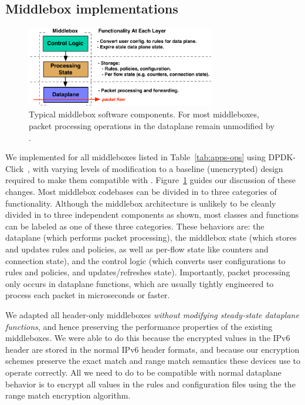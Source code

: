 \subsection{Middlebox implementations}
\label{sec:middleboxes}

\begin{figure}[t]
  \includegraphics[width=3.25in]{fig/mbarch}
  \caption[]{\label{fig:mbarch} Typical middlebox software components. For most middleboxes, packet processing operations in the dataplane remain unmodified by \sys.}
\end{figure}

We implemented \sys for all middleboxes listed in Table~\ref{tab:apps-ops} using DPDK-Click~\cite{dpdk-click}, with varying levels of modification to a baseline (unencrypted) design required to make them compatible with \sys. 
Figure~\ref{fig:mbarch} guides our discussion of these changes. Most middlebox codebases can be divided in to three categories of functionality.
Although the middlebox architecture is unlikely to be cleanly divided in to three independent components as shown, most classes and functions can be labeled as one of these three categories.
These behaviors are: the dataplane (which performs packet processing), the middlebox state (which stores and updates rules and policies, as well as per-flow state like counters and connection state), and the control logic (which converts user configurations to rules and policies, and updates/refreshes state). 
Importantly, packet processing only occurs in dataplane functions, which are usually tightly engineered to process each packet in microseconds or faster.

We adapted all header-only middleboxes {\it without modifying steady-state dataplane functions}, and hence preserving the performance properties of the existing middleboxes.
We were able to do this because the encrypted values in the IPv6 header are stored in the normal IPv6 header formats, and because our encryption schemes preserve the exact match and range match semantics these devices use to operate correctly.
All we need to do to be compatible with normal dataplane behavior is to encrypt all values in the rules and configuration files using the the range match encryption algorithm.

